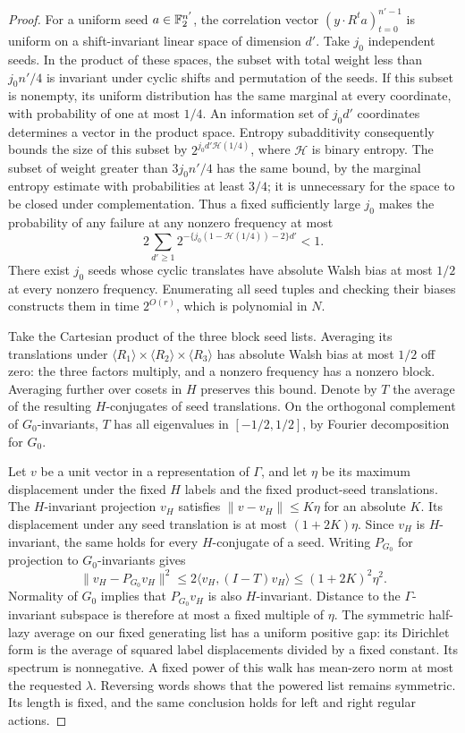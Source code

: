 \begin{proof}
For a uniform seed $a\in\mathbb{F}_2^{n'}$, the correlation vector
$(y\cdot R^ta)_{t=0}^{n'-1}$ is uniform on a shift-invariant linear
space of dimension $d'$.  Take $j_0$ independent seeds.  In the product
of these spaces, the subset with total weight less than $j_0n'/4$ is
invariant under cyclic shifts and permutation of the seeds.  If this
subset is nonempty, its uniform distribution has the same marginal at
every coordinate, with probability of one at most $1/4$.  An information
set of $j_0d'$ coordinates determines a vector in the product space.
Entropy subadditivity consequently bounds the size of this subset by
$2^{j_0d'\mathcal H(1/4)}$, where $\mathcal H$ is binary entropy.
The subset of weight greater than $3j_0n'/4$ has the same bound, by the
marginal entropy estimate with probabilities at least $3/4$; it is
unnecessary for the space to be closed under complementation.
Thus a fixed sufficiently large $j_0$ makes the probability of any
failure at any nonzero frequency at most
\begin{equation}\label{oc:seed-bound}
 2\sum_{d'\ge1}
   2^{-\{j_0(1-\mathcal H(1/4))-2\}d'}<1.
\end{equation}
There exist $j_0$ seeds whose cyclic translates have absolute Walsh
bias at most $1/2$ at every nonzero frequency.  Enumerating all seed
tuples and checking their biases constructs them in time $2^{O(r)}$,
which is polynomial in $N$.

Take the Cartesian product of the three block seed lists.  Averaging
its translations under $\langle R_1\rangle\times\langle R_2\rangle
\times\langle R_3\rangle$ has absolute Walsh bias at most $1/2$ off
zero: the three factors multiply, and a nonzero frequency has a nonzero
block.  Averaging further over cosets in $H$ preserves this bound.
Denote by $T$ the average of the resulting $H$-conjugates of seed
translations.  On the orthogonal complement of $G_0$-invariants, $T$
has all eigenvalues in $[-1/2,1/2]$, by Fourier decomposition for $G_0$.

Let $v$ be a unit vector in a representation of $\Gamma$, and let
$\eta$ be its maximum displacement under the fixed $H$ labels and the
fixed product-seed translations.  The $H$-invariant projection $v_H$
satisfies $\|v-v_H\|\le K\eta$ for an absolute $K$.  Its displacement
under any seed translation is at most $(1+2K)\eta$.  Since $v_H$ is
$H$-invariant, the same holds for every $H$-conjugate of a seed.
Writing $P_{G_0}$ for projection to $G_0$-invariants gives
\[
 \|v_H-P_{G_0}v_H\|^2
 \le 2\langle v_H,(I-T)v_H\rangle
 \le (1+2K)^2\eta^2.
\]
Normality of $G_0$ implies that $P_{G_0}v_H$ is also $H$-invariant.
Distance to the $\Gamma$-invariant subspace is therefore at most a
fixed multiple of $\eta$.  The symmetric half-lazy average on our
fixed generating list has a uniform positive gap: its Dirichlet form
is the average of squared label displacements divided by a fixed
constant.  Its spectrum is nonnegative.  A fixed power of this walk
has mean-zero norm at most the requested $\lambda$.  Reversing words
shows that the powered list remains symmetric.  Its length is fixed,
and the same conclusion holds for left and right regular actions.
\end{proof}


